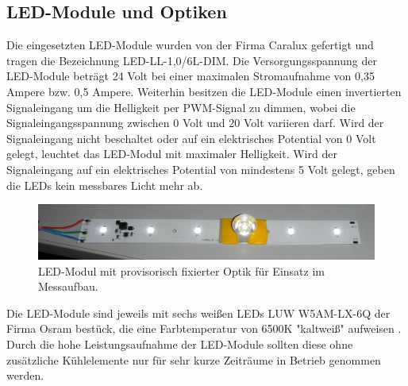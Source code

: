 \documentclass[a4paper,12pt]{scrartcl}
\begin{document}
\subsection{LED-Module und Optiken}
Die eingesetzten LED-Module wurden von der Firma Caralux gefertigt und tragen die Bezeichnung LED-LL-1,0/6L-DIM. Die Versorgungsspannung der LED-Module beträgt 24 Volt bei einer maximalen Stromaufnahme von 0,35 Ampere bzw. 0,5 Ampere. Weiterhin besitzen die LED-Module einen invertierten Signaleingang um die Helligkeit per PWM-Signal zu dimmen, wobei die Signaleingangsspannung zwischen 0 Volt und 20 Volt variieren darf. Wird der Signaleingang nicht beschaltet oder auf ein elektrisches Potential von 0 Volt gelegt, leuchtet das LED-Modul mit maximaler Helligkeit. Wird der Signaleingang auf ein elektrisches Potential von mindestens 5 Volt gelegt, geben die LEDs kein messbares Licht mehr ab.

\begin{figure}[htb]
\begin{center}
  \includegraphics[width=1\hsize]{./images/foto_hardware_ledmodul.png}
\end{center}
\caption{\label{fotohwledmodul}LED-Modul mit provisorisch fixierter Optik für Einsatz im Messaufbau.}
\end{figure}

Die LED-Module sind jeweils mit sechs wei\ss{}en LEDs LUW W5AM-LX-6Q der Firma Osram best\"uck, die eine Farbtemperatur von 6500K "kaltweiß" aufweisen \cite{specled}. Durch die hohe Leistungsaufnahme der LED-Module sollten diese ohne zus\"atzliche K\"uhlelemente nur f\"ur sehr kurze Zeitr\"aume in Betrieb genommen werden.
\end{document}

